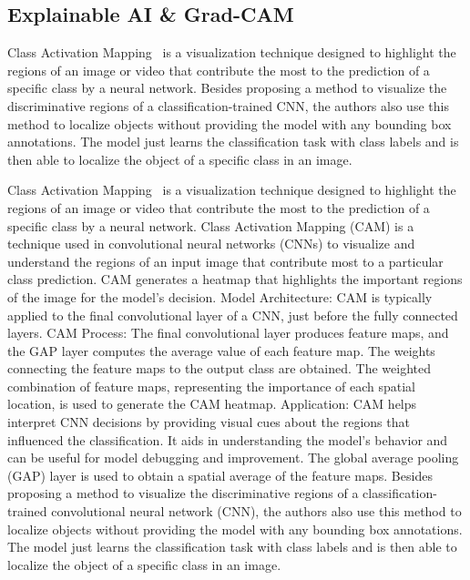 \subsection{Explainable AI \& Grad-CAM}
\label{sec:optim:cam}

Class Activation Mapping~\cite{ZhouKLOT16} is a visualization technique designed to highlight the regions of an image or video that contribute the most to the prediction of a specific class by a neural network. 
Besides proposing a method to visualize the discriminative regions of a classification-trained CNN, the authors also use this method to localize objects without providing the model with any bounding box annotations. 
The model just learns the classification task with class labels and is then able to localize the object of a specific class in an image. 

Class Activation Mapping~\cite{ZhouKLOT16} is a visualization technique designed to highlight the regions of an image or video that contribute the most to the prediction of a specific class by a neural network. 
Class Activation Mapping (CAM) is a technique used in convolutional neural networks (CNNs) to visualize and understand the regions of an input image that contribute most to a particular class prediction. CAM generates a heatmap that highlights the important regions of the image for the model's decision.
Model Architecture:
CAM is typically applied to the final convolutional layer of a CNN, just before the fully connected layers.
CAM Process:
The final convolutional layer produces feature maps, and the GAP layer computes the average value of each feature map.
The weights connecting the feature maps to the output class are obtained.
The weighted combination of feature maps, representing the importance of each spatial location, is used to generate the CAM heatmap.
Application: 
CAM helps interpret CNN decisions by providing visual cues about the regions that influenced the classification.
It aids in understanding the model's behavior and can be useful for model debugging and improvement.
The global average pooling (GAP) layer is used to obtain a spatial average of the feature maps.
Besides proposing a method to visualize the discriminative regions of a classification-trained convolutional neural network (CNN), the authors also use this method to localize objects without providing the model with any bounding box annotations. The model just learns the classification task with class labels and is then able to localize the object of a specific class in an image. 

